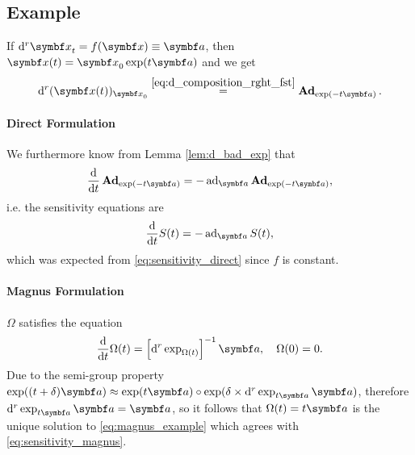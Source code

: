 \subsection{Example}


\begin{example}
  If $\mathrm{d}^{r} \x_{t} = f(\x) \equiv \a$, then $\x(t) = \x_{0} \exp(t \a)$ and we get
  \begin{equation}
    \mathrm{d}^{r} (\x(t))_{\x_{0}} \overset{\eqref{eq:d_composition_rght_fst}} = \bAd_{\exp(-t \a)}.
  \end{equation}

  \paragraph{Direct Formulation}
  We furthermore know from Lemma \ref{lem:d_bad_exp} that
  \begin{equation}
    \label{eq:1}
    \frac{\mathrm{d}}{\mathrm{d}t} \bAd_{\exp(-t \a)} = -\ad_{\a} \bAd_{\exp(-t \a)},
  \end{equation}
  i.e. the sensitivity equations are
  \begin{equation}
    \label{eq:13}
    \frac{\mathrm{d}}{\mathrm{d}t} S(t) = -\ad_{\a} S(t),
  \end{equation}
  which was expected from \eqref{eq:sensitivity_direct} since $f$ is constant.

  \paragraph{Magnus Formulation}

  $\Omega$ satisfies the equation
  \begin{equation}
    \label{eq:magnus_example}
    \frac{\mathrm{d}}{\mathrm{d}t} \Omega(t) = \left[ \mathrm{d}^{r} \exp_{\Omega(t)} \right]^{-1} \a, \quad \Omega(0) = 0.
  \end{equation}
  Due to the semi-group property $\exp((t + \delta) \a) \approx \exp(t \a) \circ \exp(\delta \times \mathrm{d}^{r} \exp_{t \a} \a)$, therefore $\mathrm{d}^{r} \exp_{t \a} \a = \a$, so it follows that $\Omega(t) = t \a$ is the unique solution to \eqref{eq:magnus_example} which agrees with \eqref{eq:sensitivity_magnus}.
\end{example}

